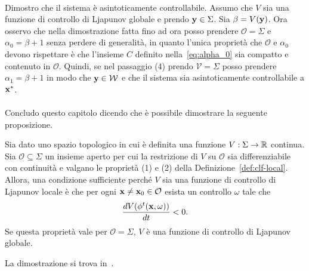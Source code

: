 \begin{steps}
    \hfill\qedsymbol\paragraph{}

    \item Dimostro che il sistema è asintoticamente controllabile.
    Assumo che $V$ sia una funzione di controllo di Ljapunov globale
    e prendo $\mathbf{y} \in \Sigma$.
    Sia $\beta = V(\mathbf{y})$.
    Ora osservo che nella dimostrazione fatta fino ad ora posso prendere
    $\mathcal O = \Sigma$ e $\alpha_0 = \beta + 1$
    senza perdere di generalità, in quanto l'unica proprietà che $\mathcal O$
    e $\alpha_0$ devono rispettare è che l'insieme $C$
    definito nella~\eqref{eq:alpha_0}
    sia compatto e contenuto in $\mathcal O$.
    Quindi, se nel passaggio (4) prendo $\mathcal V = \Sigma$
    posso prendere $\alpha_1 = \beta + 1$ in modo che
    $\mathbf{y} \in \mathcal{W}$ e che il sistema sia
    asintoticamente controllabile a $\mathbf{x}^*$.

    \hfill\qedsymbol\paragraph{}

\end{steps}

Concludo questo capitolo dicendo che è possibile
dimostrare la seguente proposizione.
\begin{prop}
    \label{prop:condizione-sufficiente-ljapunov}
    Sia dato uno spazio topologico in cui è 
    definita una funzione $V : \Sigma \to \mathbb{R}$ continua.
    Sia $\mathcal O \subseteq \Sigma$
    un insieme aperto per cui la restrizione di
    $V$ su $\mathcal O$ sia differenziabile con 
    continuità e valgano le proprietà (1) e (2) 
    della Definizione~\ref{def:clf-local}.
    Allora, una condizione sufficiente perché $V$
    sia una funzione di controllo di Ljapunov locale è che per ogni $\mathbf{x} \neq \mathbf{x}_0 \in \mathcal O$
    esista un controllo $\omega$ tale che
    \begin{equation*}
        \frac{dV(\phi^t(\mathbf{x}, \omega))}{dt} < 0.
    \end{equation*}
    Se questa proprietà vale per $\mathcal O = \Sigma$, $V$ è una funzione di controllo di Ljapunov globale.
\end{prop}
La dimostrazione si trova in~\cite{sontagMath}.